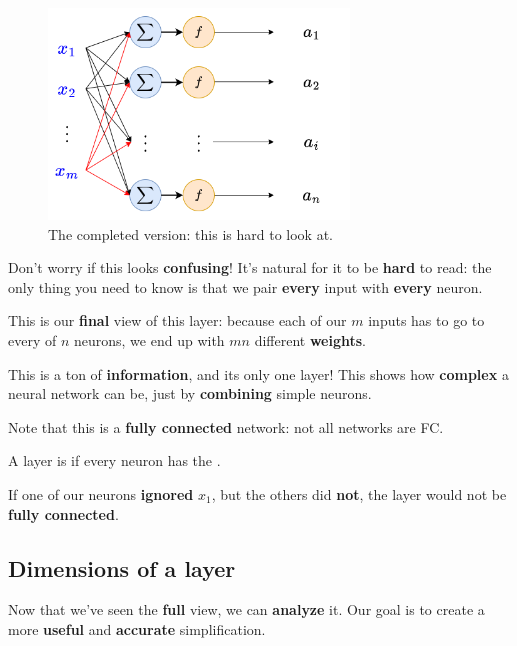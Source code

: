         \begin{figure}[H]
            \centering
            \includegraphics[width=80mm,scale=0.4]{images/nn_images/layers_all_neuron_input.png}
            \caption*{The completed version: this is hard to look at.}
        \end{figure}
        
        Don't worry if this looks \textbf{confusing}! It's natural for it to be \textbf{hard} to read: the only thing you need to know is that we pair \textbf{every} input with \textbf{every} neuron.
        
        This is our \textbf{final} view of this layer: because each of our $m$ inputs has to go to every of $n$ neurons, we end up with $mn$ different \textbf{weights}.
        
        This is a ton of \textbf{information}, and its only one layer! This shows how \textbf{complex} a neural network can be, just by \textbf{combining} simple neurons.
        
        Note that this is a \textbf{fully connected} network: not all networks are FC.\\
        
        \begin{definition}
            A layer is  if every neuron has the .
        \end{definition}
        
        \miniex If one of our neurons \textbf{ignored} $x_1$, but the others did \textbf{not}, the layer would not be \textbf{fully connected}.
        
    \subsection{Dimensions of a layer}
    
        Now that we've seen the \textbf{full} view, we can \textbf{analyze} it. Our goal is to create a more \textbf{useful} and \textbf{accurate} simplification.
        
